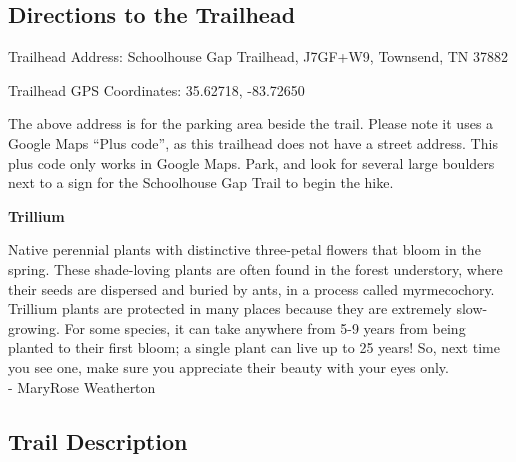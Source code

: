 \documentclass[
  letterpaper,
  DIV=11,
  numbers=noendperiod]{scrreprt}
\begin{document}
\subsection{Directions to the
Trailhead}\label{directions-to-the-trailhead-22}

Trailhead Address: Schoolhouse Gap Trailhead, J7GF+W9, Townsend, TN
37882

Trailhead GPS Coordinates: 35.62718, -83.72650

The above address is for the parking area beside the trail. Please note
it uses a Google Maps ``Plus code'', as this trailhead does not have a
street address. This plus code only works in Google Maps. Park, and look
for several large boulders next to a sign for the Schoolhouse Gap Trail
to begin the hike.

\begin{tcolorbox}[enhanced jigsaw, opacityback=0, bottomrule=.15mm, colframe=quarto-callout-note-color-frame, breakable, arc=.35mm, leftrule=.75mm, rightrule=.15mm, toprule=.15mm, left=2mm, colback=white]
\begin{minipage}[t]{5.5mm}
\textcolor{quarto-callout-note-color}{\faInfo}
\end{minipage}%
\begin{minipage}[t]{\textwidth - 5.5mm}

\vspace{-3mm}\textbf{Trillium}\vspace{3mm}

Native perennial plants with distinctive three-petal flowers that bloom
in the spring. These shade-loving plants are often found in the forest
understory, where their seeds are dispersed and buried by ants, in a
process called myrmecochory. Trillium plants are protected in many
places because they are extremely slow-growing. For some species, it can
take anywhere from 5-9 years from being planted to their first bloom; a
single plant can live up to 25 years! So, next time you see one, make
sure you appreciate their beauty with your eyes only.\\
- MaryRose Weatherton

\end{minipage}%
\end{tcolorbox}

\subsection{Trail Description}\label{trail-description-22}
\end{document}
